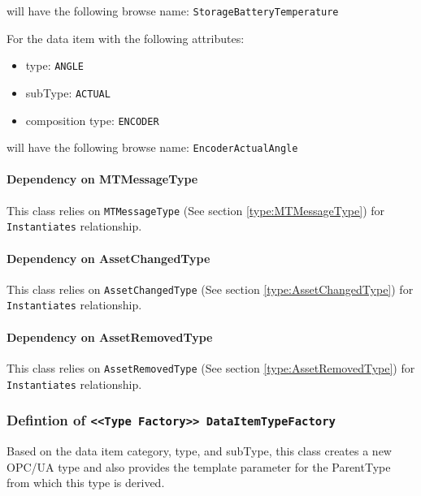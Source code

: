 \begin{itemize}
will have the following browse name: \texttt{StorageBatteryTemperature}

For the data item with the following attributes:

\begin{itemize}
\item type: \texttt{ANGLE}
\item subType: \texttt{ACTUAL}
\item composition type: \texttt{ENCODER}
\end{itemize}

will have the following browse name: \texttt{EncoderActualAngle}


\end{itemize}
\paragraph{Dependency on MTMessageType}

This class relies on \texttt{MTMessageType} (See section \ref{type:MTMessageType}) for \texttt{Instantiates} relationship.

\paragraph{Dependency on AssetChangedType}

This class relies on \texttt{AssetChangedType} (See section \ref{type:AssetChangedType}) for \texttt{Instantiates} relationship.

\paragraph{Dependency on AssetRemovedType}

This class relies on \texttt{AssetRemovedType} (See section \ref{type:AssetRemovedType}) for \texttt{Instantiates} relationship.

\FloatBarrier
\subsubsection{Defintion of \texttt{<<Type Factory>> DataItemTypeFactory}} \label{type:DataItemTypeFactory}

\FloatBarrier

Based on the data item category, type, and subType, this class creates a new OPC/UA type 
and also provides the template parameter for the ParentType from which this type is derived. 


